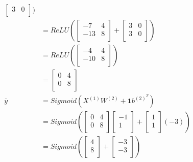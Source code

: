 \documentclass[addpoints]{exam}
\begin{document}
\begin{align*}
\begin{bmatrix}
            3 & 0\\
        \end{bmatrix})\\
        &= ReLU(\begin{bmatrix}
        -7 & 4\\
        -13 & 8\\
        \end{bmatrix} + 
        \begin{bmatrix}
            3 & 0\\
            3 & 0\\
        \end{bmatrix})\\
        &= ReLU(\begin{bmatrix}
            -4 & 4\\
            -10 & 8\\
        \end{bmatrix})\\
        &= \begin{bmatrix}
            0 & 4\\
            0 & 8\\
        \end{bmatrix}\\
        \overline{y} &= Sigmoid(X^{(1)}W^{(2)}+\textbf{1}b^{(2)}^T)\\
        &= Sigmoid(\begin{bmatrix}
            0 & 4\\
            0 & 8\\
        \end{bmatrix}\begin{bmatrix}
            -1\\
            1\\
        \end{bmatrix}+\begin{bmatrix}
            1\\
            1\\
        \end{bmatrix}(-3))\\
        &= Sigmoid(\begin{bmatrix}
            4\\
            8\\
        \end{bmatrix}+\begin{bmatrix}
            -3\\
            -3\\
        \end{bmatrix})\\

\end{align*}
\end{document}
